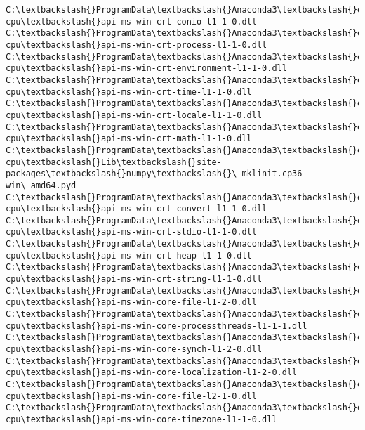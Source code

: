 \documentclass[11pt]{article}
\begin{document}
\begin{Verbatim}[commandchars=\\\{\}]
C:\textbackslash{}ProgramData\textbackslash{}Anaconda3\textbackslash{}envs\textbackslash{}fastai-cpu\textbackslash{}api-ms-win-crt-conio-l1-1-0.dll
C:\textbackslash{}ProgramData\textbackslash{}Anaconda3\textbackslash{}envs\textbackslash{}fastai-cpu\textbackslash{}api-ms-win-crt-process-l1-1-0.dll
C:\textbackslash{}ProgramData\textbackslash{}Anaconda3\textbackslash{}envs\textbackslash{}fastai-cpu\textbackslash{}api-ms-win-crt-environment-l1-1-0.dll
C:\textbackslash{}ProgramData\textbackslash{}Anaconda3\textbackslash{}envs\textbackslash{}fastai-cpu\textbackslash{}api-ms-win-crt-time-l1-1-0.dll
C:\textbackslash{}ProgramData\textbackslash{}Anaconda3\textbackslash{}envs\textbackslash{}fastai-cpu\textbackslash{}api-ms-win-crt-locale-l1-1-0.dll
C:\textbackslash{}ProgramData\textbackslash{}Anaconda3\textbackslash{}envs\textbackslash{}fastai-cpu\textbackslash{}api-ms-win-crt-math-l1-1-0.dll
C:\textbackslash{}ProgramData\textbackslash{}Anaconda3\textbackslash{}envs\textbackslash{}fastai-cpu\textbackslash{}Lib\textbackslash{}site-packages\textbackslash{}numpy\textbackslash{}\_mklinit.cp36-win\_amd64.pyd
C:\textbackslash{}ProgramData\textbackslash{}Anaconda3\textbackslash{}envs\textbackslash{}fastai-cpu\textbackslash{}api-ms-win-crt-convert-l1-1-0.dll
C:\textbackslash{}ProgramData\textbackslash{}Anaconda3\textbackslash{}envs\textbackslash{}fastai-cpu\textbackslash{}api-ms-win-crt-stdio-l1-1-0.dll
C:\textbackslash{}ProgramData\textbackslash{}Anaconda3\textbackslash{}envs\textbackslash{}fastai-cpu\textbackslash{}api-ms-win-crt-heap-l1-1-0.dll
C:\textbackslash{}ProgramData\textbackslash{}Anaconda3\textbackslash{}envs\textbackslash{}fastai-cpu\textbackslash{}api-ms-win-crt-string-l1-1-0.dll
C:\textbackslash{}ProgramData\textbackslash{}Anaconda3\textbackslash{}envs\textbackslash{}fastai-cpu\textbackslash{}api-ms-win-core-file-l1-2-0.dll
C:\textbackslash{}ProgramData\textbackslash{}Anaconda3\textbackslash{}envs\textbackslash{}fastai-cpu\textbackslash{}api-ms-win-core-processthreads-l1-1-1.dll
C:\textbackslash{}ProgramData\textbackslash{}Anaconda3\textbackslash{}envs\textbackslash{}fastai-cpu\textbackslash{}api-ms-win-core-synch-l1-2-0.dll
C:\textbackslash{}ProgramData\textbackslash{}Anaconda3\textbackslash{}envs\textbackslash{}fastai-cpu\textbackslash{}api-ms-win-core-localization-l1-2-0.dll
C:\textbackslash{}ProgramData\textbackslash{}Anaconda3\textbackslash{}envs\textbackslash{}fastai-cpu\textbackslash{}api-ms-win-core-file-l2-1-0.dll
C:\textbackslash{}ProgramData\textbackslash{}Anaconda3\textbackslash{}envs\textbackslash{}fastai-cpu\textbackslash{}api-ms-win-core-timezone-l1-1-0.dll

\end{Verbatim}
\end{document}
